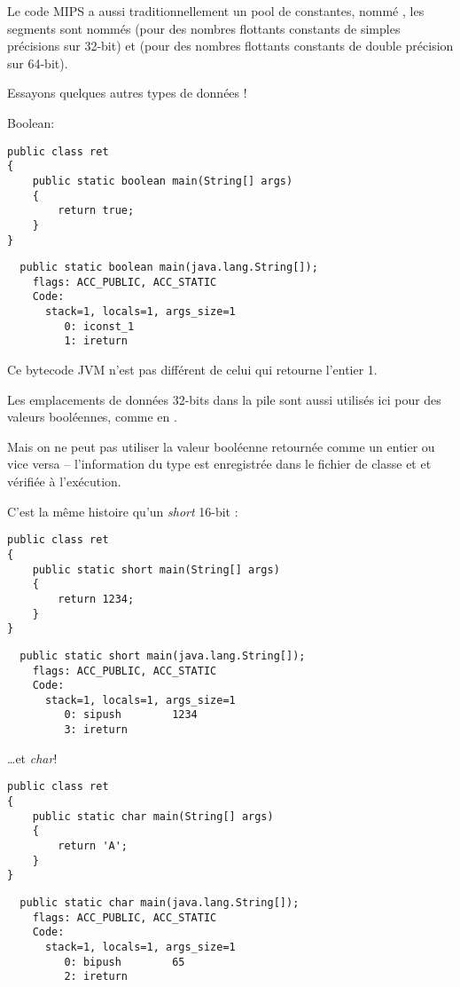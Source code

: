 Le code MIPS a aussi traditionnellement un pool de constantes, nommé , les segments
sont nommés  (pour des nombres flottants constants de simples précisions sur 32-bit) et 
(pour des nombres flottants constants de double précision sur 64-bit).

Essayons quelques autres types de données !

Boolean:

\begin{lstlisting}[style=customjava]
public class ret
{
	public static boolean main(String[] args) 
	{
		return true;
	}
}
\end{lstlisting}

\begin{lstlisting}
  public static boolean main(java.lang.String[]);
    flags: ACC_PUBLIC, ACC_STATIC
    Code:
      stack=1, locals=1, args_size=1
         0: iconst_1      
         1: ireturn       
\end{lstlisting}

Ce bytecode JVM n'est pas différent de celui qui retourne l'entier 1.

Les emplacements de données 32-bits dans la pile sont aussi utilisés ici pour des valeurs booléennes, comme en \CCpp.

Mais on ne peut pas utiliser la valeur booléenne retournée comme un entier ou vice versa -- l'information du type est enregistrée dans le fichier de classe et et vérifiée à l'exécution.

C'est la même histoire qu'un \emph{short} 16-bit :

\begin{lstlisting}[style=customjava]
public class ret
{
	public static short main(String[] args) 
	{
		return 1234;
	}
}
\end{lstlisting}

\begin{lstlisting}
  public static short main(java.lang.String[]);
    flags: ACC_PUBLIC, ACC_STATIC
    Code:
      stack=1, locals=1, args_size=1
         0: sipush        1234
         3: ireturn       
\end{lstlisting}

\dots et \emph{char}!

\begin{lstlisting}[style=customjava]
public class ret
{
	public static char main(String[] args) 
	{
		return 'A';
	}
}
\end{lstlisting}

\begin{lstlisting}
  public static char main(java.lang.String[]);
    flags: ACC_PUBLIC, ACC_STATIC
    Code:
      stack=1, locals=1, args_size=1
         0: bipush        65
         2: ireturn       
\end{lstlisting}

